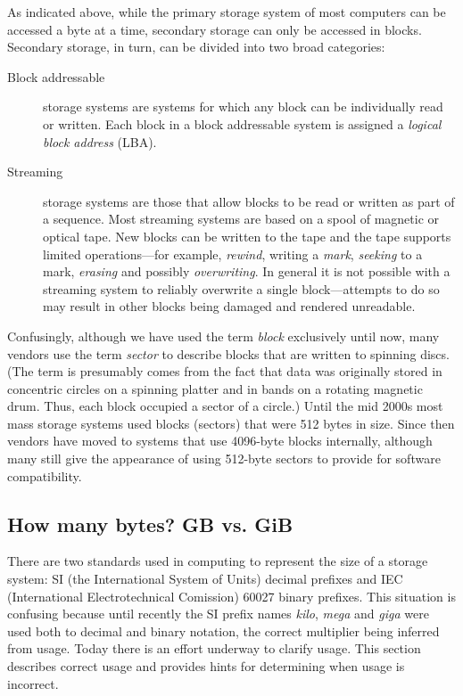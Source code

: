 As indicated above, while the primary storage system of most computers can be accessed a
byte at a time, secondary storage can only be accessed in
blocks. Secondary storage, in turn, can be divided into two broad
categories:

\begin{description}
\item[Block addressable] storage systems are systems for which any
  block can be individually read or written. Each block in a block
  addressable system is assigned a \emph{logical block address}
  (LBA). 
\item[Streaming] storage systems are those that allow blocks to be
  read or written as part of a sequence. Most streaming systems are
  based on a spool of magnetic or optical tape. New blocks can be
  written to the tape and the tape supports limited operations---for
  example, \emph{rewind}, writing a \emph{mark}, \emph{seeking} to a mark,
   \emph{erasing} and possibly \emph{overwriting}. In general it is
   not possible with a streaming system to reliably overwrite a single
   block---attempts to do so may result in other blocks being damaged
   and rendered unreadable.
\end{description}

Confusingly, although we have used the term \emph{block} exclusively
until now, many vendors use the term \emph{sector} to describe blocks
that are written to spinning discs. (The term is presumably comes from
the fact that data was originally stored in concentric circles on a spinning platter
and in bands on a rotating magnetic drum. Thus, each block occupied a
sector of a circle.) Until the mid 2000s most mass storage systems
used blocks (sectors) that were 512 bytes in size. Since then vendors
have moved to systems that use 4096-byte blocks internally, although
many still give the appearance of using 512-byte sectors to provide
for software compatibility. 

\subsection{How many bytes? GB vs. GiB}

There are two standards used in computing to represent the size of a
storage system: SI (the International System of Units) decimal
prefixes and IEC (International Electrotechnical Comission) 60027
binary prefixes. This situation is confusing because until recently
the SI prefix names \emph{kilo}, \emph{mega} and \emph{giga} were used
both to decimal and binary notation, the correct multiplier being
inferred from usage. Today there is an effort underway to clarify
usage. This section describes correct usage and provides hints for
determining when usage is incorrect.

